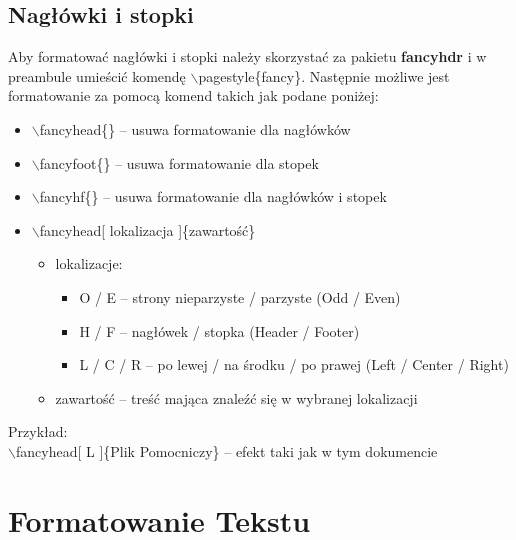 \documentclass[a4paper, 12pt]{article}
\begin{document}
\subsection{Nagłówki i stopki}
Aby formatować nagłówki i stopki należy skorzystać za pakietu \textbf{fancyhdr} i w preambule umieścić komendę  $\backslash$pagestyle\{fancy\}. Następnie możliwe jest formatowanie za pomocą komend takich jak podane poniżej:
\begin{itemize}
	\item $\backslash$fancyhead\{\} -- usuwa formatowanie dla nagłówków
	\item $\backslash$fancyfoot\{\} -- usuwa formatowanie dla stopek
	\item $\backslash$fancyhf\{\} -- usuwa formatowanie dla nagłówków i stopek
	\item $\backslash$fancyhead[ lokalizacja ]\{zawartość\}
	\begin{itemize}
		\item lokalizacje:
		\begin{itemize}
			\item O / E -- strony nieparzyste / parzyste (Odd / Even)
			\item H / F -- nagłówek / stopka (Header / Footer)
			\item L / C / R -- po lewej / na środku / po prawej (Left / Center / Right)
		\end{itemize}
		\item zawartość -- treść mająca znaleźć się w wybranej lokalizacji
	\end{itemize}
\end{itemize}

Przykład:\\
$\backslash$fancyhead[ L ]\{Plik Pomocniczy\} -- efekt taki jak w tym dokumencie


\section{Formatowanie Tekstu}
\end{document}
